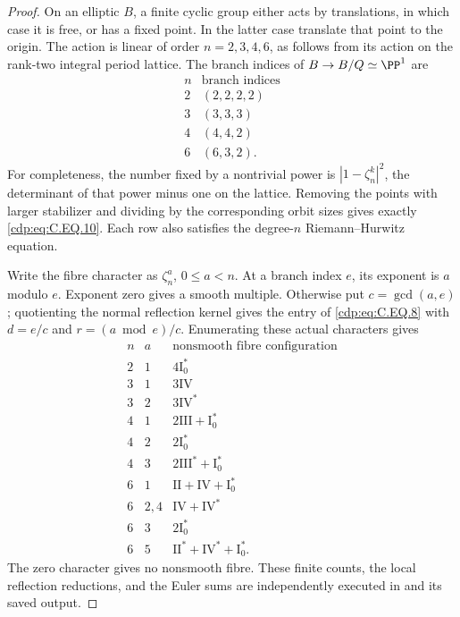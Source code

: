 \begin{proof}
On an elliptic $B$, a finite cyclic group either
acts by translations, in which case it is free,
or has a fixed point. In the latter case translate
that point to the origin. The action is linear of
order $n=2,3,4,6$, as follows from its action on
the rank-two integral period lattice. The branch
indices of $B\to B/Q\simeq\PP^1$ are
\[
\begin{array}{c|c}
n&\text{branch indices}\\ \hline
2&(2,2,2,2)\\
3&(3,3,3)\\
4&(4,4,2)\\
6&(6,3,2).
\end{array}                                                   \tag{C.EQ.10}\label{cdp:eq:C.EQ.10}
\]
For completeness, the number fixed by a nontrivial
power is $|1-\zeta_n^k|^2$, the determinant of
that power minus one on the lattice. Removing
the points with larger stabilizer and dividing
by the corresponding orbit sizes gives exactly
\eqref{cdp:eq:C.EQ.10}. Each row also satisfies the degree-$n$
Riemann--Hurwitz equation.

Write the fibre character as $\zeta_n^a$,
$0\le a<n$. At a branch index $e$, its exponent
is $a$ modulo $e$. Exponent zero gives a smooth
multiple. Otherwise put $c=\gcd(a,e)$; quotienting
the normal reflection kernel gives the entry of
\eqref{cdp:eq:C.EQ.8} with $d=e/c$ and $r=(a\bmod e)/c$.
Enumerating these actual characters gives
\[
\begin{array}{c|c|l}
n&a&\text{nonsmooth fibre configuration}\\ \hline
2&1&4\mathrm I_0^*\\
3&1&3\mathrm{IV}\\
3&2&3\mathrm{IV}^*\\
4&1&2\mathrm{III}+\mathrm I_0^*\\
4&2&2\mathrm I_0^*\\
4&3&2\mathrm{III}^*+\mathrm I_0^*\\
6&1&\mathrm{II}+\mathrm{IV}+\mathrm I_0^*\\
6&2,4&\mathrm{IV}+\mathrm{IV}^*\\
6&3&2\mathrm I_0^*\\
6&5&\mathrm{II}^*+\mathrm{IV}^*+\mathrm I_0^* .
\end{array}                                                   \tag{C.EQ.11}\label{cdp:eq:C.EQ.11}
\]
The zero character gives no nonsmooth fibre.
These finite counts, the local reflection reductions,
and the Euler sums are independently executed in
 and its
saved output.


\end{proof}
